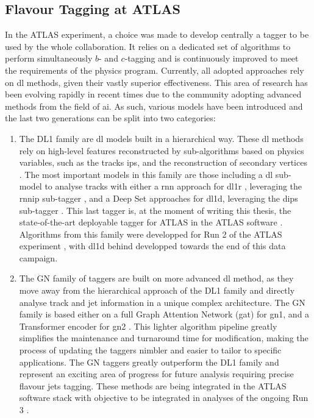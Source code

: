 \subsection{Flavour Tagging at ATLAS}
In the ATLAS experiment, a choice was made to develop centrally a tagger to be used by the whole collaboration. It relies on a dedicated set of algorithms to perform simultaneously $b$- and $c$-tagging and is continuously improved to meet the requirements of the physics program. Currently, all adopted approaches rely on \gls{dl} methods, given their vastly superior effectiveness. This area of research has been evolving rapidly in recent times due to the community adopting advanced methods from the field of \gls{ai}. As such, various models have been introduced and the last two generations can be split into two categories: 
\begin{enumerate}
  \item The DL1 family are \gls{dl} models built in a hierarchical way. These \gls{dl} methods rely on high-level features reconstructed by sub-algorithms based on physics variables, such as the tracks \glspl{ip}, and the reconstruction of secondary vertices \cite{ATL-PHYS-PUB-2015-022}. The most important models in this family are those including a \gls{dl} sub-model to analyse tracks with either a \gls{rnn} approach for \gls{dl1r} \cite{ATLAS:2017bcq}, leveraging the \gls{rnnip} sub-tagger \cite{ATL-PHYS-PUB-2017-003}, and a Deep Set approaches for \gls{dl1d}, leveraging the \gls{dips} sub-tagger \cite{ATL-PHYS-PUB-2020-014}. This last tagger is, at the moment of writing this thesis, the state-of-the-art deployable tagger for ATLAS in the ATLAS software \cite{ATL-SOFT-PUB-2021-001}. Algorithms from this family were developped for Run 2 of the ATLAS experiment \cite{atlas:FTAGRUN2}, with \gls{dl1d} behind developped towards the end of this data campaign.
  \item The GN family of taggers are built on more advanced \gls{dl} method, as they move away from the hierarchical approach of the DL1 family and directly analyse track and jet information in a unique complex architecture. The GN family is based either on a full Graph Attention Network (\gls{gat}) for \gls{gn1}, and a Transformer encoder for \gls{gn2} \cite{ATL-PHYS-PUB-2022-027, ATL-PLOT-FTAG-2023-01, duperrin2023flavour}. This lighter algorithm pipeline greatly simplifies the maintenance and turnaround time for modification, making the process of updating the taggers nimbler and easier to tailor to specific applications. The GN taggers greatly outperform the DL1 family and represent an exciting area of progress for future analysis requiring precise flavour jets tagging. These methods are being integrated in the ATLAS software stack with objective to be integrated in analyses of the ongoing Run 3 \cite{ATL-SOFT-PUB-2021-001}.  
\end{enumerate}

